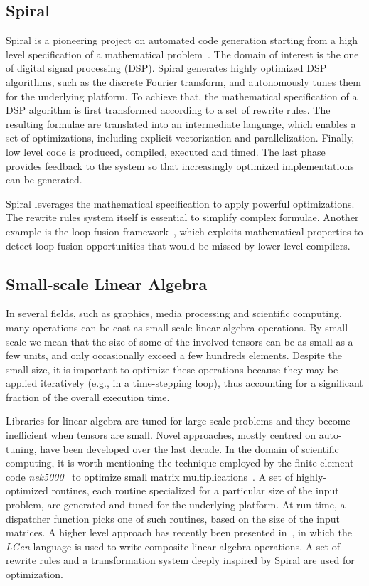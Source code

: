 \subsection{Spiral}
Spiral is a pioneering project on automated code generation starting from a high level specification of a mathematical problem~\citep{Pueschel:05}. The domain of interest is the one of digital signal processing (DSP). Spiral generates highly optimized DSP algorithms, such as the discrete Fourier transform, and autonomously tunes them for the underlying platform. To achieve that, the mathematical specification of a DSP algorithm is first transformed according to a set of rewrite rules. The resulting formulae are translated into an intermediate language, which enables a set of optimizations, including explicit vectorization and parallelization. Finally, low level code is produced, compiled, executed and timed. The last phase provides feedback to the system so that increasingly optimized implementations can be generated. 

Spiral leverages the mathematical specification to apply powerful optimizations. The rewrite rules system itself is essential to simplify complex formulae. Another example is the loop fusion framework~\citep{spiral-fusion}, which exploits mathematical properties to detect loop fusion opportunities that would be missed by lower level compilers.


\subsection{Small-scale Linear Algebra}
In several fields, such as graphics, media processing and scientific computing, many operations can be cast as small-scale linear algebra operations. By small-scale we mean that the size of some of the involved tensors can be as small as a few units, and only occasionally exceed a few hundreds elements. Despite the small size, it is important to optimize these operations because they may be applied iteratively (e.g., in a time-stepping loop), thus accounting for a significant fraction of the overall execution time. 

Libraries for linear algebra are tuned for large-scale problems and they become inefficient when tensors are small. Novel approaches, mostly centred on auto-tuning, have been developed over the last decade. In the domain of scientific computing, it is worth mentioning the technique employed by the finite element code {\em nek5000}~\citep{nek5000-web-page} to optimize small matrix multiplications~\citep{nek5000}. A set of highly-optimized routines, each routine specialized for a particular size of the input problem, are generated and tuned for the underlying platform. At run-time, a dispatcher function picks one of such routines, based on the size of the input matrices. A higher level approach has recently been presented in~\cite{Spampinato:14}, in which the {\em LGen} language is used to write composite linear algebra operations. A set of rewrite rules and a transformation system deeply inspired by Spiral are used for optimization.

